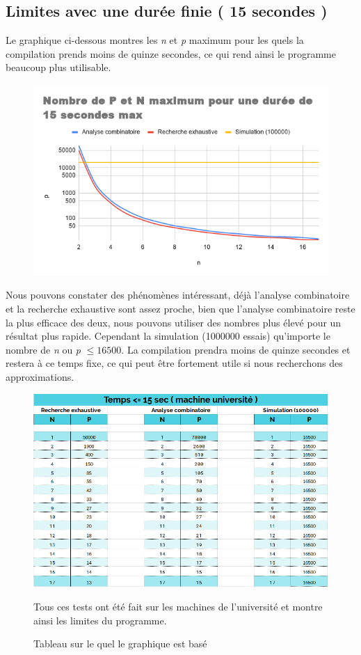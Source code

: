 \documentclass[a4paper, 11pt, oneside]{article}
\begin{document}
\subsection{Limites avec une durée finie ( 15 secondes )}
Le graphique ci-dessous montres les \textit{n} et \textit{p} maximum pour les quels la compilation prends moins de quinze secondes, ce qui rend ainsi le programme beaucoup plus utilisable.
\begin{figure}[!h]
			\centering
\includegraphics[scale=0.4]{graphique2.png}
		\end{figure}

Nous pouvons constater des phénomènes intéressant, déjà l'analyse combinatoire et la recherche exhaustive sont assez proche, bien que l'analyse combinatoire reste la plus efficace des deux, nous pouvons utiliser des nombres plus élevé pour un résultat plus rapide. Cependant la simulation (1000000 essais) qu’importe le nombre de \textit{n}  ou \textit{p} $\leq 16500$. La compilation prendra moins de quinze secondes et restera à ce temps fixe, ce qui peut être fortement utile si nous recherchons des approximations.
\begin{figure}[!h]
\centering
\includegraphics[scale=0.5]{tableau2.png}
\caption{Tableau sur le quel le graphique est basé}

Tous ces tests ont été fait sur les machines de l'université et montre ainsi les limites du programme.
\end{figure}
\newpage
\end{document}
